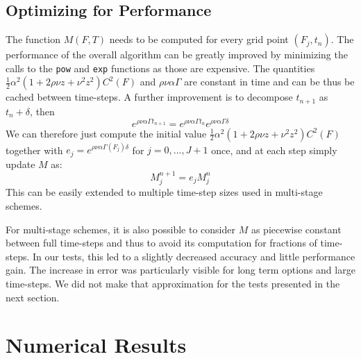 \documentclass[]{rAMF2e}
\begin{document}
\subsection{Optimizing for Performance}
The function $M(F,T)$ needs to be computed for every grid point $\left(F_j, t_n\right)$. The performance of the overall algorithm can be greatly improved by minimizing the calls to the \texttt{pow} and \texttt{exp} functions as those are expensive. The quantities $\frac{1}{2} \alpha^2 (1+2\rho\nu z+ \nu^2 z^2) C^2(F)$ and $\rho\nu\alpha\Gamma$ are constant in time and can be thus be cached between time-steps. A further improvement is to decompose $t_{n+1}$ as $t_{n}+\delta$, then 
\begin{equation}
e^{\rho\nu\alpha\Gamma t_{n+1}}=e^{\rho\nu\alpha\Gamma t_n}e^{\rho\nu\alpha\Gamma \delta}
\end{equation}
We can therefore just compute the initial value $\frac{1}{2} \alpha^2 (1+2\rho\nu z+ \nu^2 z^2) C^2(F)$ together with $e_j = e^{\rho\nu\alpha\Gamma(F_j) \delta}$ for $j=0,...,J+1$ once, and at each step simply update $M$ as:
\begin{equation}
M_j^{n+1} = e_j M_j^{n} 
\end{equation}
This can be easily extended to multiple time-step sizes used in multi-stage schemes.

For multi-stage schemes, it is also possible to consider $M$ as piecewise constant between full time-steps and thus to avoid its computation for fractions of time-steps. In our tests, this led to a slightly decreased accuracy and little performance gain. The increase in error was particularly visible for long term options and large time-steps. We did not make that approximation for the tests presented in the next section.

\section{Numerical Results}
\end{document}

